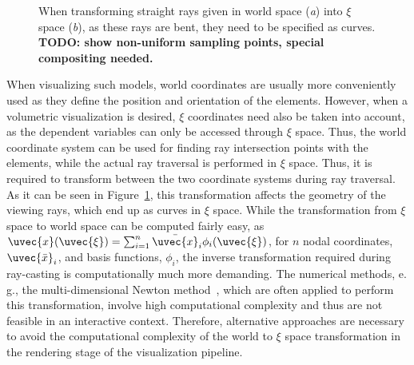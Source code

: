 \documentclass[review,journal]{vgtc}         %
\begin{document}
\begin{figure}[b]
    \centering
    \hspace*{0.5cm}
    \caption{When transforming straight rays given in world space ({\it a}) into $\xi$ space ({\it b}), as these rays are bent, they need to be specified as curves. \textbf{TODO: show non-uniform sampling points, special compositing needed.}}
    \label{fig:raycoords}
\end{figure}

When visualizing such models, world coordinates are usually more conveniently used as they define the position and orientation of the elements. However, when a volumetric visualization is desired, $\xi$ coordinates need also be taken into account, as the dependent variables can only be accessed through $\xi$ space. Thus, the world coordinate system can be used for finding ray intersection points with the elements, while the actual ray traversal is performed in $\xi$ space. Thus, it is required to transform between the two coordinate systems during ray traversal. As it can be seen in Figure~\ref{fig:raycoords}, this transformation affects the geometry of the viewing rays, which end up as curves in $\xi$ space. While the transformation from $\xi$ space to world space can be computed fairly easy, as $\uvec{x}(\uvec{\xi})=\sum_{i=1}^n \bar{\uvec{x}}_i \phi_i(\uvec{\xi})$, for $n$ nodal coordinates, $\uvec{\bar{x}}_i$, and basis functions, $\phi_i$, the inverse transformation required during ray-casting is computationally much more demanding. The numerical methods, e.\,g., the multi-dimensional Newton method~\cite{Press92}, which are often applied to perform this transformation, involve high computational complexity and thus are not feasible in an interactive context. Therefore, alternative approaches are necessary to avoid the computational complexity of the world to $\xi$ space transformation in the rendering stage of the visualization pipeline.
\end{document}
